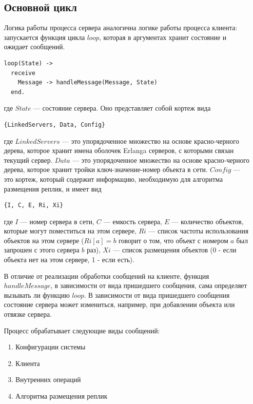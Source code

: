 		\subsection{Основной цикл}
			Логика работы процесса сервера аналогична логике работы процесса клиента: запускается функция цикла $loop$, которая в аргументах хранит состояние и ожидает сообщений.
			\begin{lstlisting}
loop(State) ->
  receive
    Message -> handleMessage(Message, State)
  end.		
			\end{lstlisting}
			где $State$ --- состояние сервера. Оно представляет собой кортеж вида
			\begin{lstlisting}
{LinkedServers, Data, Config}			
			\end{lstlisting}
			где $LinkedServers$ --- это упорядоченное множество на основе красно-черного дерева, которое хранит имена оболочек Erlanga серверов, с которыми связан текущий сервер.
			$Data$ --- это упорядоченное множество на основе красно-черного дерева, которое хранит тройки ключ-значение-номер объекта в сети. $Config$ --- это кортеж, который содержит 
			информацию, необходимую для алгоритма размещения реплик, и имеет вид
			\begin{lstlisting}
{I, C, E, Ri, Xi}			
			\end{lstlisting}
			где $I$ --- номер сервера в сети, $C$ --- емкость сервера, $E$ --- количество объектов, которые могут поместиться на этом сервере, $Ri$ --- список частоты использования
			объектов на этом сервере ($Ri[a] = b$ говорит о том, что объект с номером $a$ был запрошен с этого сервера $b$ раз), $Xi$ --- список размещения 
			объектов (0 - если объекта нет на этом сервере, 1 - если есть).

			В отличие от реализации обработки сообщений на клиенте, функция $handleMessage$, в зависимости от вида пришедшего сообщения, сама определяет вызывать ли функцию
			$loop$. В зависимости от вида пришедшего сообщения состояние сервера может измениться, например, при добавлении объекта или отвязке сервера.

			Процесс обрабатывает следующие виды сообщений:
			\begin{enumerate}
				\item Конфигурации системы
				\item Клиента 
				\item Внутренних операций
				\item Алгоритма размещения реплик
			\end{enumerate}

